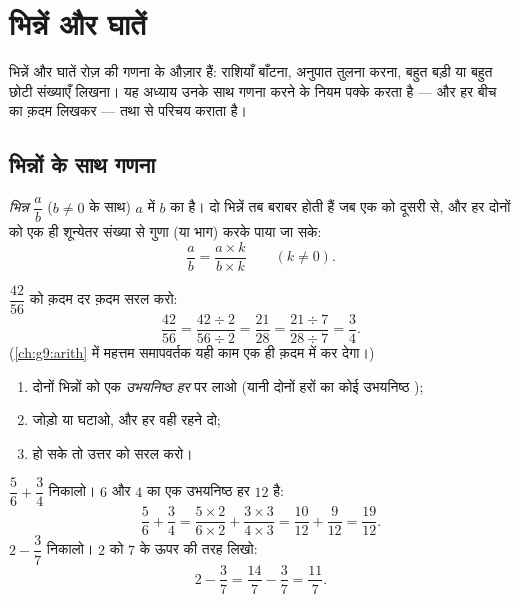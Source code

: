 \chapter{भिन्नें और घातें}\label{ch:g9:fractions}

भिन्नें और घातें रोज़ की गणना के औज़ार हैं: राशियाँ बाँटना, अनुपात
तुलना करना, बहुत बड़ी या बहुत छोटी संख्याएँ लिखना। यह अध्याय उनके
साथ गणना करने के नियम पक्के करता है --- और हर बीच का क़दम लिखकर ---
तथा  से परिचय कराता है।

\section{भिन्नों के साथ गणना}

\begin{definition}[भिन्न]\label{def:g9:fractions:fraction}
\emph{भिन्न} $\dfrac ab$ ($b \neq 0$ के साथ) $a$ में
$b$ का  है। दो भिन्नें तब बराबर होती हैं जब एक को दूसरी से,
 और हर दोनों को एक ही शून्येतर संख्या से गुणा (या भाग) करके पाया
जा सके:
\[
\frac ab = \frac{a \times k}{b \times k} \qquad (k \neq 0).
\]
\end{definition}

\begin{example}\label{ex:g9:fractions:simplify}
$\dfrac{42}{56}$ को क़दम दर क़दम सरल करो:
\[
\frac{42}{56} = \frac{42 \div 2}{56 \div 2} = \frac{21}{28}
= \frac{21 \div 7}{28 \div 7} = \frac34 .
\]
(\cref{ch:g9:arith} में महत्तम समापवर्तक यही काम एक ही क़दम में कर
देगा।)
\end{example}

\begin{method}[भिन्नें जोड़ना और घटाना]\label{met:g9:fractions:add}
\begin{enumerate}
  \item दोनों भिन्नों को एक \emph{उभयनिष्ठ हर} पर लाओ (यानी दोनों
        हरों का कोई उभयनिष्ठ );
  \item {} जोड़ो या घटाओ, और हर वही रहने दो;
  \item हो सके तो उत्तर को सरल करो।
\end{enumerate}
\end{method}

\begin{example}\label{ex:g9:fractions:add}
$\dfrac56 + \dfrac34$ निकालो। $6$ और $4$ का एक उभयनिष्ठ हर $12$
है:
\[
\frac56 + \frac34
= \frac{5 \times 2}{6 \times 2} + \frac{3 \times 3}{4 \times 3}
= \frac{10}{12} + \frac{9}{12}
= \frac{19}{12}.
\]
$2 - \dfrac37$ निकालो। $2$ को $7$ के ऊपर  की तरह लिखो:
\[
2 - \frac37 = \frac{14}{7} - \frac37 = \frac{11}{7}.
\]
\end{example}


